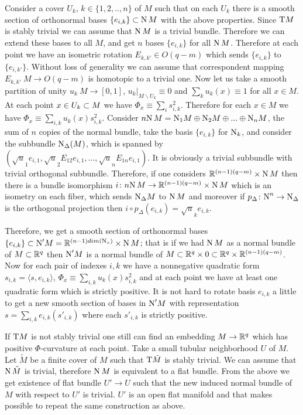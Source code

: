 \documentclass{article}
\begin{document}
Consider a cover $U_k$, $k\in \{1,2,..,n\}$
of $M$ such that on each $U_k$ there is a smooth section of
orthonormal bases $\{e_{i,k}\}\subset \text{\rm N}\,M$ with the above properties.
Since $\text{\rm T} M$ is stably trivial we can assume that $\text{\rm N}\,M$ is a trivial bundle.
Therefore we
can extend these bases to all $M$, and get $n$ bases
$\{e_{i,k}\}$ for all $\text{\rm N}\,M$.
Therefore at each point we have an isometric rotation $E_{k,k'}\in O(q-m)$
which sends $\{e_{i,k}\}$ to $\{e_{i,k'}\}$.
Without loss of generality we can assume that correspondent mapping
$E_{k,k'}\:M\to O(q-m)$ is homotopic to a trivial one.
Now let us take a smooth partition of unity $u_k\:M\to [0,1]$,
$u_k|_{M\backslash U_k}\equiv 0$ and
$\sum_k u_k(x)\equiv 1$ for all $x\in M$.
At each point $x\in U_k\subset M$ we have
$\Phi_x\equiv \sum_i s_{i,k}^2$.
Therefore for each $x\in M$ we have
$\Phi_x\equiv \sum_{i,k} u_k(x) s_{i,k}^2$.
Consider $n\text{\rm N}\,M=\text{\rm N}_1 M\oplus \text{\rm N}_2 M\oplus ...\oplus \text{\rm N}_n M$,
the sum of $n$ copies of the normal bundle,
take the basis $\{e_{i,k}\}$ for $\text{\rm N}_k$, and consider the subbundle $\text{\rm N}_\Delta(M)$,
which is spanned by
$(\sqrt u_1 e_{i,1}, \sqrt u_2 E_{12}e_{i,1},..., \sqrt u_n E_{1n}e_{i,1})$.
It is obviously a trivial subbundle with trivial orthogonal subbundle.
Therefore, if one considers $\mathbb{R}^{(n-1)(q-m)}\times \text{\rm N}\,M$ then there is
a bundle isomorphism $i\colon n\text{\rm N}\,M\to \mathbb{R}^{(n-1)(q-m)}\times \text{\rm N}\,M$
which is an isometry on each fiber, which sends
$\text{\rm N}_\Delta M$ to $\text{\rm N}\,M$ and moreover
if $p_\Delta\colon\text{\rm N}^n\to \text{\rm N}_\Delta$ is the orthogonal projection then $i\circ p_\Delta (e_{i,k})=\sqrt u_k e_{i,k}$.

Therefore, we get a smooth section of orthonormal bases
$\{e_{i,k}\}\subset \text{\rm N}'M=\mathbb{R}^{(n-1)dim(\text{\rm N}_x)}\times \text{\rm N}\, M$;
that is if we had $\text{\rm N}\,M$ as a normal bundle of $M\subset \mathbb{R}^{q}$ then $\text{\rm N}'M$ is a
normal bundle of $M\subset \mathbb{R}^{q}\times 0\subset \mathbb{R}^{q}\times
\mathbb{R}^{(n-1)(q-m)}$. Now for each pair of indexes $i,k$ we have a
nonnegative quadratic form $s_{i,k}= \langle s,e_{i,k}\rangle$,
$\Phi_x\equiv \sum_{i,k} u_k(x) s_{i,k}^2$ and at each point we
have at least one quadratic form which is strictly positive. It is
not hard to rotate basis $e_{i,k}$ a little to get a new smooth
section of bases in $\text{\rm N}'M$ with representation $s= \sum_{i,k}
e_{i,k}(s'_{i,k})$ where each $s'_{i,k}$ is strictly positive.

If $\text{\rm T} M$ is not stably trivial one still can find an embedding $M\to \mathbb{R}^q$
which has positive $\Phi$-curvature at each point.
Take a small tubular neighborhood $U$ of $M$.
Let $\tilde M$ be a finite cover of $M$ such that $\text{\rm T} \tilde M$ is stably trivial.
 We can assume that $\text{\rm N}\,\tilde M$
is trivial, therefore $\text{\rm N}\,M$ is equivalent to a flat bundle.
From the above we get existence of
flat bundle $U'\to U$ such that the new induced normal bundle of $M$ with
respect to $U'$ is trivial. $U'$ is an open flat manifold and that
makes possible to repeat the same construction as above.
\qeds
\end{document}
